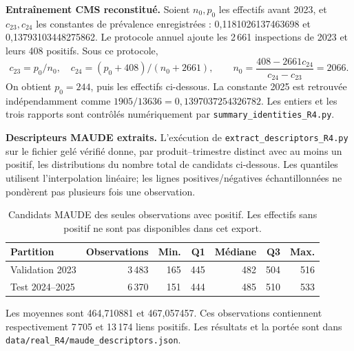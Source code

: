 \documentclass[10pt,a4paper]{article}
\newcommand{\src}[1]{{\small\nolinkurl{#1}}}
\begin{document}
\textbf{Entraînement CMS reconstitué.} Soient $n_0,p_0$ les effectifs avant 2023, et $c_{23},c_{24}$ les constantes de prévalence enregistrées : 0,1181026137463698 et 0,13793103448275862. Le protocole annuel ajoute les 2\,661 inspections de 2023 et leurs 408 positifs\cite{hgbcode}. Sous ce protocole,
\[
 c_{23}=p_0/n_0,\quad c_{24}=(p_0+408)/(n_0+2661),\qquad
 n_0=\frac{408-2661c_{24}}{c_{24}-c_{23}}=2066.
\]
On obtient $p_0=244$, puis les effectifs ci-dessous. La constante 2025 est retrouvée indépendamment comme $1905/13636=0,1397037254326782$. Les entiers et les trois rapports sont contrôlés numériquement par \src{summary_identities_R4.py}.
\begin{table}[!htbp]\centering\small
\caption{Effectifs CMS reconstruits algébriquement sous le protocole déclaré, non lus directement dans les lignes d'entraînement.}

\end{table}

\par{}
\textbf{Descripteurs MAUDE extraits.} L'exécution de \src{extract_descriptors_R4.py} sur le fichier gelé vérifié donne, par produit--trimestre distinct avec au moins un positif, les distributions du nombre total de candidats ci-dessous. Les quantiles utilisent l'interpolation linéaire; les lignes positives/négatives échantillonnées ne pondèrent pas plusieurs fois une observation.

\begin{table}[!htbp]\centering\small
\caption{Candidats MAUDE des seules observations avec positif. Les effectifs sans positif ne sont pas disponibles dans cet export.}
\begin{tabular}{@{}lrrrrrr@{}}\toprule
Partition & Observations & Min. & Q1 & Médiane & Q3 & Max.\\\midrule
Validation 2023 & 3\,483 & 165 & 445 & 482 & 504 & 516\\
Test 2024--2025 & 6\,370 & 151 & 444 & 485 & 510 & 533\\\bottomrule
\end{tabular}
\end{table}

Les moyennes sont 464,710881 et 467,057457. Ces observations contiennent respectivement 7\,705 et 13\,174 liens positifs. Les résultats et la portée sont dans \src{data/real_R4/maude_descriptors.json}.
\end{document}
